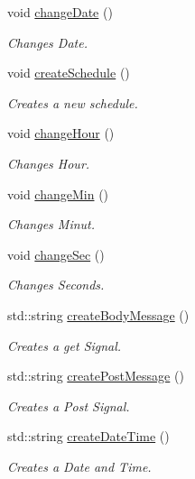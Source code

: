 \begin{DoxyCompactItemize}
void \hyperlink{classGroupsSchedulerControlWidget_ab6ad2e1c29b2a06efa40e8e398eb374d}{change\+Date} ()
\begin{DoxyCompactList}\small\item\em Changes Date. \end{DoxyCompactList}\item 
void \hyperlink{classGroupsSchedulerControlWidget_a6df78641d065e8809c4873fdbdac77e6}{create\+Schedule} ()
\begin{DoxyCompactList}\small\item\em Creates a new schedule. \end{DoxyCompactList}\item 
void \hyperlink{classGroupsSchedulerControlWidget_a783e81e56b248978a3e9aec1a3c0e56a}{change\+Hour} ()
\begin{DoxyCompactList}\small\item\em Changes Hour. \end{DoxyCompactList}\item 
void \hyperlink{classGroupsSchedulerControlWidget_aca37ab4026a878b2e5243552820f35e8}{change\+Min} ()
\begin{DoxyCompactList}\small\item\em Changes Minut. \end{DoxyCompactList}\item 
void \hyperlink{classGroupsSchedulerControlWidget_a0fedb95feb0a6e9fb00a0d7f2cb187b4}{change\+Sec} ()
\begin{DoxyCompactList}\small\item\em Changes Seconds. \end{DoxyCompactList}\item 
std\+::string \hyperlink{classGroupsSchedulerControlWidget_aa8111aca2cfbc117213d9e7dfd5a503b}{create\+Body\+Message} ()
\begin{DoxyCompactList}\small\item\em Creates a get Signal. \end{DoxyCompactList}\item 
std\+::string \hyperlink{classGroupsSchedulerControlWidget_aef3a307a1c642bc4385d62156a1ec76f}{create\+Post\+Message} ()
\begin{DoxyCompactList}\small\item\em Creates a Post Signal. \end{DoxyCompactList}\item 
std\+::string \hyperlink{classGroupsSchedulerControlWidget_a03abe13834f18994a47725c22f4437b4}{create\+Date\+Time} ()
\begin{DoxyCompactList}\small\item\em Creates a Date and Time. \end{DoxyCompactList}\end{DoxyCompactItemize}
